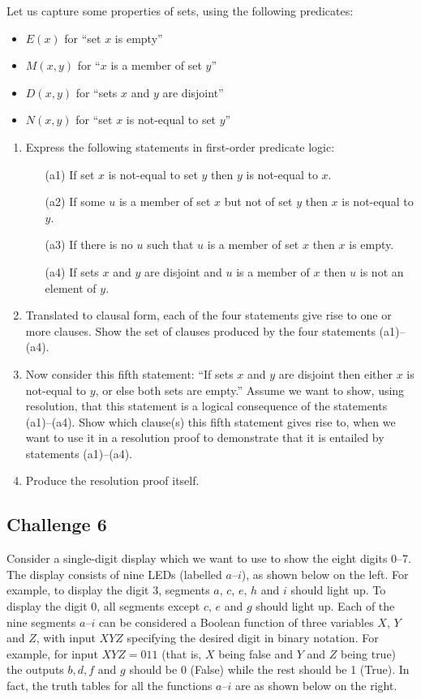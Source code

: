 \documentclass[12pt]{article}
\begin{document}
Let us capture some properties of sets, using the following predicates:
\begin{itemize}
\setlength{\itemsep}{-0.5ex}
\item
$E(x)$ for ``set $x$ is empty''
\item
$M(x,y)$ for ``$x$ is a member of set $y$''
\item
$D(x,y)$ for ``sets $x$ and $y$ are disjoint''
\item
$N(x,y)$ for ``set $x$ is not-equal to set $y$''
\end{itemize}
\begin{enumerate}
\item
Express the following statements in first-order predicate logic:
\begin{itemize}
\setlength{\itemsep}{-0.3ex}
\item[(a1)]
If set $x$ is not-equal to set $y$ then $y$ is not-equal to $x$.
\item[(a2)]
If some $u$ is a member of set $x$ but not of set $y$
then $x$ is not-equal to $y$.
\item[(a3)]
If there is no $u$ such that $u$ is a member of set $x$ then $x$ is empty.
\item[(a4)]
If sets $x$ and $y$ are disjoint and $u$ is a member of $x$ then $u$ is
not an element of $y$.
\end{itemize}
\item
Translated to clausal form, 
each of the four statements give rise to one or more clauses.
Show the set of clauses produced by the four statements (a1)--(a4).
\item
Now consider this fifth statement: ``If sets $x$ and $y$ are disjoint 
then either $x$ is not-equal to $y$, or else both sets are empty.''
Assume we want to show, using resolution, that this statement
is a logical consequence of the statements (a1)--(a4).
Show which clause(s) this fifth statement gives rise to, when we want to
use it in a resolution proof to demonstrate that it is entailed by 
statements (a1)--(a4).
\item
Produce the resolution proof itself.
\end{enumerate}

\subsection*{Challenge 6}

Consider a single-digit display which we want to use to show the eight 
digits 0--7.
The display consists of nine LEDs (labelled $a$--$i$),
as shown below on the left.
For example, to display the digit 3, 
segments $a$, $c$, $e$, $h$ and $i$ should light up.
To display the digit 0, all segments except
$c$, $e$ and $g$ should light up.
Each of the nine segments $a$--$i$ can be considered a Boolean
function of three variables $X$, $Y$ and $Z$, with
input $XYZ$ specifying the desired digit in binary notation.
For example, for input $XYZ = 011$ (that is, $X$ being false and
$Y$ and $Z$ being true) the outputs $b, d, f$ and $g$ should be 0
(False) while the rest should be 1 (True).
In fact, the truth tables for all the functions $a$--$i$ are as 
shown below on the right.
\bigskip
\end{document}
